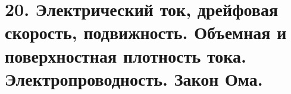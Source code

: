 \section*{20. Электрический ток, дрейфовая скорость, подвижность. Объемная и
поверхностная плотность тока. Электропроводность. Закон Ома.}